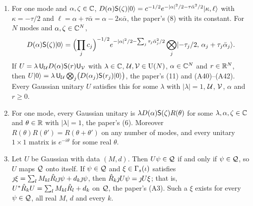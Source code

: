 \begin{veteenv}
\begin{corollary}\label{cor:gu-vacuum}
\begin{enumerate}
\item[(a)] For one mode and $\alpha,\zeta\in\mathbb C$, $D(\alpha)\mathsf S(\zeta)\lvert 0\rangle=c^{-1/2}e^{-\lvert\alpha\rvert^2/2-\tau\bar\alpha^2/2}\lvert \kappa,\ell\rangle$ with
$\kappa=-\tau/2$ and $\ell=\alpha+\tau\bar\alpha=\alpha-2\kappa\bar\alpha$, the paper's (8) with its constant. For $N$ modes and
$\alpha,\zeta\in\mathbb C^N$,
\[
 D(\alpha)\mathsf S(\zeta)\lvert 0\rangle=\Bigl(\prod_jc_j\Bigr)^{-1/2}e^{-\lvert\alpha\rvert^2/2-\sum_j\tau_j\bar\alpha_j^2/2}\bigotimes_j\lvert -\tau_j/2,\,\alpha_j+\tau_j\bar\alpha_j\rangle.
\]
If $U=\lambda\,\mathsf U_\mathcal U D(\alpha)\mathsf S(r)\mathsf U_\mathcal V$ with $\lambda\in\mathbb C$, $\mathcal U,\mathcal V\in\mathrm{U}(N)$, $\alpha\in\mathbb C^N$ and $r\in\mathbb R^N$, then
$U\lvert 0\rangle=\lambda\,\mathsf U_\mathcal U\bigotimes_j\bigl(D(\alpha_j)\mathsf S(r_j)\lvert 0\rangle\bigr)$, the paper's (11) and (A40)--(A42). Every Gaussian unitary $U$
satisfies this for some $\lambda$ with $\lvert\lambda\rvert=1$, $\mathcal U$, $\mathcal V$, $\alpha$ and $r\ge0$.
\item[(b)] For one mode, every Gaussian unitary is $\lambda D(\alpha)\mathsf S(\zeta)R(\theta)$ for some $\lambda,\alpha,\zeta\in\mathbb C$ and $\theta\in\mathbb R$
with $\lvert\lambda\rvert=1$, the paper's (6). Moreover $R(\theta)R(\theta')=R(\theta+\theta')$ on any number of modes, and every unitary
$1\times1$ matrix is $e^{-i\theta}$ for some real $\theta$.
\item[(c)] Let $U$ be Gaussian with data $(M,d)$. Then $U\psi\in\mathcal Q$ if and only if $\psi\in\mathcal Q$, so $U$ maps $\mathcal Q$ onto itself. If
$\psi\in\mathcal Q$ and $\xi\in\Gamma_s(\iota)$ satisfies $\jmath\xi=\sum_lM_{kl}\hat R_l\jmath\psi+d_k\jmath\psi$, then $\hat R_k\jmath U\psi=\jmath U\xi$; that is,
$U^*\hat R_kU=\sum_lM_{kl}\hat R_l+d_k$ on $\mathcal Q$, the paper's (A3). Such a $\xi$ exists for every $\psi\in\mathcal Q$, all real $M$, $d$ and every $k$.
\end{enumerate}
\end{corollary}


\end{veteenv}
